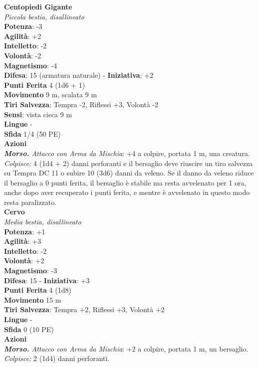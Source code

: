 \begin{multicols}{2}
\medskip\textbf{Centopiedi Gigante}\\
\emph{Piccola bestia, disallineato}\\
\textbf{Potenza}: -3\\
\textbf{Agilità}: +2\\
\textbf{Intelletto}: -2\\
\textbf{Volontà}: -2\\
\textbf{Magnetismo}: -4\\
\textbf{Difesa}: 15 (armatura naturale) - \textbf{Iniziativa}: +2\\
\textbf{Punti Ferita} 4 (1d6 + 1)\\
\textbf{Movimento} 9 m, scalata 9 m\\
\textbf{Tiri Salvezza}: Tempra -2, Riflessi +3, Volontà -2 \\
\textbf{Sensi}: vista cieca 9 m\\
\textbf{Lingue} -\\
\textbf{Sfida} 1/4 (50 PE)\smallskip\\
\smallskip\textbf{Azioni}\\
\emph{\textbf{Morso.} Attacco con Arma da Mischia}: +4 a colpire, portata 1 m, una creatura.\\
\emph{Colpisce:} 4 (1d4 + 2) danni perforanti e il bersaglio deve riuscire un tiro salvezza su Tempra DC 11 o subire 10 (3d6) danni da veleno. Se il danno da veleno riduce il bersaglio a 0 punti ferita, il bersaglio è stabile ma resta avvelenato per 1 ora, anche dopo aver recuperato i punti ferita, e mentre è avvelenato in questo modo resta paralizzato.\\

\medskip\textbf{Cervo}\\
\emph{Media bestia, disallineato}\\
\textbf{Potenza}: +1\\
\textbf{Agilità}: +3\\
\textbf{Intelletto}: -2\\
\textbf{Volontà}: +2\\
\textbf{Magnetismo}: -3\\
\textbf{Difesa}: 15 - \textbf{Iniziativa}: +3\\
\textbf{Punti Ferita} 4 (1d8)\\
\textbf{Movimento} 15 m\\
\textbf{Tiri Salvezza}: Tempra +2, Riflessi +3, Volontà +2 \\
\textbf{Lingue} -\\
\textbf{Sfida} 0 (10 PE)\smallskip\\
\smallskip\textbf{Azioni}\\
\emph{\textbf{Morso.} Attacco con Arma da Mischia}: +2 a colpire, portata 1 m, un bersaglio.\\
\emph{Colpisce:} 2 (1d4) danni perforanti.\\


\end{multicols}
